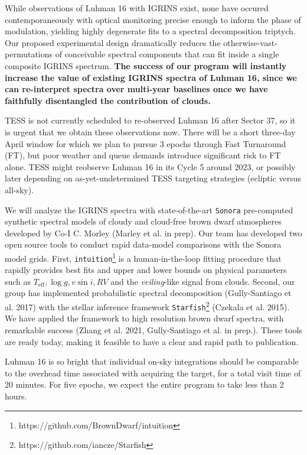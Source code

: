 \documentclass[11pt]{article}
\begin{document}
{{\expdesign

While observations of Luhman 16 with IGRINS exist, none have occured contemporaneously with optical monitoring precise enough to inform the phase of modulation, yielding highly degenerate fits to a spectral decomposition triptych.  Our proposed experimental design dramatically reduces the otherwise-vast-permutations of conceivable spectral components that can fit inside a single composite IGRINS spectrum.  \textbf{The success of our program will instantly increase the value of existing IGRINS spectra of Luhman 16, since we can re-interpret spectra over multi-year baselines once we have faithfully disentangled the contribution of clouds.}

TESS is not currently scheduled to re-observed Luhman 16 after Sector 37, so it is urgent that we obtain these observations now.  There will be a short three-day April window for which we plan to pursue 3 epochs through Fast Turnaround (FT), but poor weather and queue demands introduce significant risk to FT alone.  TESS might reobserve Luhman 16 in its Cycle 5 around 2023, or possibly later depending on as-yet-undetermined TESS targeting strategies (ecliptic versus all-sky).

We will analyze the IGRINS spectra with state-of-the-art \texttt{Sonora} pre-computed synthetic spectral models of cloudy and cloud-free brown dwarf atmospheres developed by Co-I C. Morley (Marley et al. in prep).  Our team has developed two open source tools to conduct rapid data-model comparisons with the Sonora model grids. First, \texttt{intuition}\footnote{https://github.com/BrownDwarf/intuition} is a human-in-the-loop fitting procedure that rapidly provides best fits and upper and lower bounds on physical parameters such as $T_{\mathrm{eff}}, \log{g}, v\sin{i}, RV$ and the \emph{veiling}-like signal from clouds.  Second, our group has implemented probabilistic spectral decomposition (Gully-Santiago et al. 2017) with the stellar inference framework \texttt{Starfish}\footnote{https://github.com/iancze/Starfish} (Czekala et al. 2015).  We have applied the framework to high resolution brown dwarf spectra, with remarkable success (Zhang et al. 2021, Gully-Santiago et al. in prep.).  These tools are ready today, making it feasible to have a clear and rapid path to publication.

Luhman 16 is so bright that individual on-sky integrations should be comparable to the overhead time associated with acquiring the target, for a total visit time of 20 minutes.  For five epochs, we expect the entire program to take less than 2 hours.


}}
\end{document}
